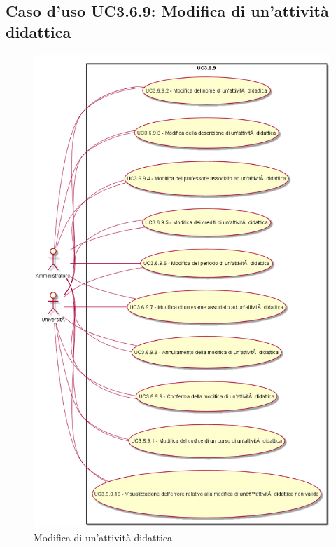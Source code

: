 \subsection{Caso d'uso \texorpdfstring{UC3.6.9}{UC3.6.9}: Modifica di un'attività didattica}
\begin{figure} [H]
\centering
\includegraphics[scale=0.45]{./img/UC3-6-9.png}
\caption{Modifica di un'attività didattica}\label{}
\end{figure}
